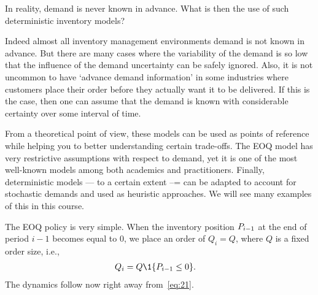 \begin{exercise}
In reality,  demand is never known in advance. What is then the use of such deterministic inventory models?

\begin{solution}
Indeed almost all inventory management environments demand is not known in advance. But there are many cases where the variability of the demand is so low that the influence of the demand uncertainty can be safely ignored. Also, it is not uncommon to have `advance demand information' in some industries where customers place their order before they actually want it to be delivered. If this is the case, then one can  assume that the demand is known with considerable certainty over some interval of time. 

From a theoretical point of view, these models can be used as points of reference while helping you to better understanding certain trade-offs. The EOQ model has very restrictive assumptions with respect to demand, yet it is one of the most well-known models among both academics and practitioners. Finally, deterministic models --- to a certain extent --= can be adapted to account for stochastic demands and used as heuristic approaches. We will see many examples of this in this course.  
\end{solution}
\end{exercise}





The EOQ policy is very simple. When the inventory position $P_{i-1}$ at the end of period $i-1$ becomes equal to $0$, we place an order of $Q_i=Q$, where $Q$ is a fixed order size, i.e., 
\begin{subequations}
\begin{align}
  Q_{i} &= Q\1{\IP_{i-1}\leq 0}.
\end{align}
\end{subequations}
The dynamics follow now right away from~\eqref{eq:21}. 


